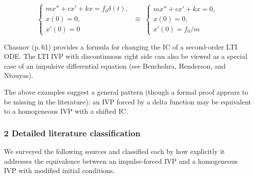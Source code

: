 \documentclass[
  11pt,
]{article}
\begin{document}
\[
\begin{cases}
m x'' + c x' + k x = f_0 \delta(t), \\
x(0) = 0, \\
x'(0) = 0
\end{cases}
\;\equiv\;
\begin{cases}
m x'' + c x' + k x = 0, \\
x(0) = 0, \\
x'(0) = f_0/m
\end{cases}
\]

Chasnov (p.\,61) provides a formula for changing the IC of a
second-order LTI ODE. The LTI IVP with discontinuous right side can also
be viewed as a special case of an impulsive differential equation (see
Benchohra, Henderson, and Ntouyas).

The above examples suggest a general pattern (though a formal proof
appears to be missing in the literature): an IVP forced by a delta
function may be equivalent to a homogeneous IVP with a shifted IC.

\hypertarget{detailed-literature-classification}{%
\subsubsection{2 Detailed literature
classification}\label{detailed-literature-classification}}

We surveyed the following sources and classified each by how explicitly
it addresses the equivalence between an impulse-forced IVP and a
homogeneous IVP with modified initial conditions.
\end{document}

